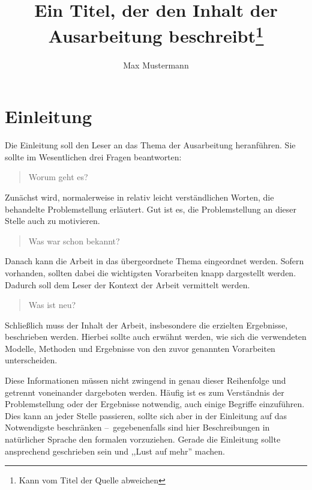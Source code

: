 \documentclass[draft]{tcs-seminar}
\begin{document}
\title{Ein Titel, der den Inhalt der Ausarbeitung beschreibt\footnote{Kann vom Titel der Quelle abweichen}}
\author{Max Mustermann}

\begin{abstract}

\end{abstract}

\maketitle


\section{Einleitung}

Die Einleitung soll den Leser an das Thema der Ausarbeitung heranführen.
Sie sollte im Wesentlichen drei Fragen beantworten:

\begin{quote}
  Worum geht es?
\end{quote}
Zunächst wird, normalerweise in relativ leicht verständlichen Worten,
die behandelte Problemstellung erläutert.
Gut ist es, die Problemstellung an dieser Stelle auch zu motivieren.

\begin{quote}
  Was war schon bekannt?
\end{quote}
Danach kann die Arbeit in das übergeordnete Thema eingeordnet werden.
Sofern vorhanden, sollten dabei
die wichtigsten Vorarbeiten knapp dargestellt werden.
Dadurch soll dem Leser der Kontext der Arbeit vermittelt werden.

\begin{quote}
  Was ist neu?
\end{quote}
Schließlich muss der Inhalt der Arbeit,
insbesondere die erzielten Ergebnisse, beschrieben werden.
Hierbei sollte auch erwähnt werden,
wie sich die verwendeten Modelle, Methoden und Ergebnisse
von den zuvor genannten Vorarbeiten unterscheiden.

Diese Informationen müssen nicht zwingend
in genau dieser Reihenfolge und getrennt voneinander dargeboten werden.
Häufig ist es zum Verständnis der Problemstellung
oder der Ergebnisse notwendig, auch einige Begriffe einzuführen.
Dies kann an jeder Stelle passieren,
sollte sich aber in der Einleitung auf das Notwendigste beschränken
--~gegebenenfalls sind hier Beschreibungen in natürlicher Sprache
den formalen vorzuziehen.
Gerade die Einleitung sollte ansprechend geschrieben sein
und ,,Lust auf mehr'' machen.
\end{document}

